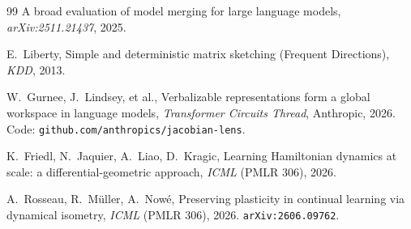\documentclass[10pt,a4paper]{article}
\theoremstyle{plain}
\theoremstyle{definition}
\begin{document}
\begin{thebibliography}{99}
 A broad evaluation of model merging for large language models,
\textit{arXiv:2511.21437}, 2025.

 E.~Liberty, Simple and deterministic matrix sketching (Frequent
Directions), \textit{KDD}, 2013.

 W.~Gurnee, J.~Lindsey, et al., Verbalizable representations form a
global workspace in language models, \textit{Transformer Circuits Thread}, Anthropic,
2026. Code: \texttt{github.com/anthropics/jacobian-lens}.

 K.~Friedl, N.~Jaquier, A.~Liao, D.~Kragic, Learning
Hamiltonian dynamics at scale: a differential-geometric approach, \textit{ICML} (PMLR
306), 2026.

 A.~Rosseau, R.~M\"uller, A.~Now\'e, Preserving plasticity in
continual learning via dynamical isometry, \textit{ICML} (PMLR 306), 2026.
\texttt{arXiv:2606.09762}.

\end{thebibliography}
\end{document}
